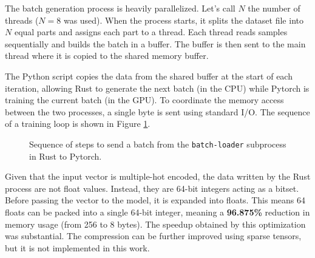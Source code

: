 The batch generation process is heavily parallelized. Let's call $N$ the number of threads ($N=8$ was used). When the process starts, it splits the dataset file into $N$ equal parts and assigns each part to a thread. Each thread reads samples sequentially and builds the batch in a buffer. The buffer is then sent to the main thread where it is copied to the shared memory buffer.

The Python script copies the data from the shared buffer at the start of each iteration, allowing Rust to generate the next batch (in the CPU) while Pytorch is training the current batch (in the GPU). To coordinate the memory access between the two processes, a single byte is sent using standard I/O. The sequence of a training loop is shown in Figure \ref{training-loop}.

\begin{figure}[H]
\centering
{}
\caption{Sequence of steps to send a batch from the \texttt{batch-loader} subprocess in Rust to Pytorch.}
\label{training-loop}
\end{figure}

Given that the input vector is multiple-hot encoded, the data written by the Rust process are not float values. Instead, they are 64-bit integers acting as a bitset. Before passing the vector to the model, it is expanded into floats. This means 64 floats can be packed into a single 64-bit integer, meaning a \textbf{96.875\%} reduction in memory usage (from 256 to 8 bytes). The speedup obtained by this optimization was substantial. The compression can be further improved using sparse tensors, but it is not implemented in this work. \\



